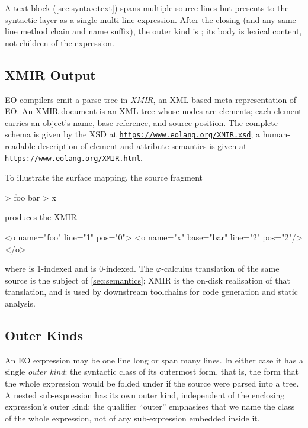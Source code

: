 A text block (\cref{sec:syntax:text}) spans multiple source lines but
  presents to the syntactic layer as a single multi-line expression.
After the closing  (and any same-line method chain and name suffix),
  the outer kind is ;
  its body is lexical content, not children of the expression.

\subsection{XMIR Output}\label{sec:syntax:xmir}

EO compilers emit a parse tree in \emph{XMIR}, an XML-based meta-representation
  of EO.
An XMIR document is an XML tree whose nodes are  elements;
  each element carries an object's name, base reference, and source position.
The complete schema is given by the XSD at
  \href{https://www.eolang.org/XMIR.xsd}{\texttt{https://www.eolang.org/XMIR.xsd}};
  a human-readable description of element and attribute semantics is given
  at \href{https://www.eolang.org/XMIR.html}{\texttt{https://www.eolang.org/XMIR.html}}.

To illustrate the surface mapping, the source fragment

\begin{ffcode}
[] > foo
  bar > x
\end{ffcode}

produces the XMIR

\begin{ffcode}
<o name="foo" line="1" pos="0">
  <o name="x" base="bar" line="2" pos="2"/>
</o>
\end{ffcode}

where  is 1-indexed and  is 0-indexed.
The \(\varphi\)-calculus translation of the same source is the subject of
  \cref{sec:semantics};
  XMIR is the on-disk realisation of that translation, and is used by
  downstream toolchains for code generation and static analysis.

\subsection{Outer Kinds}\label{sec:syntax:outer-kinds}

An EO expression may be one line long or span many lines.
In either case it has a single \emph{outer kind}:
  the syntactic class of its outermost form, that is, the form that the
  whole expression would be folded under if the source were parsed into
  a tree.
A nested sub-expression has its own outer kind, independent of the
  enclosing expression's outer kind; the qualifier \enquote{outer}
  emphasises that we name the class of the whole expression, not of any
  sub-expression embedded inside it.


